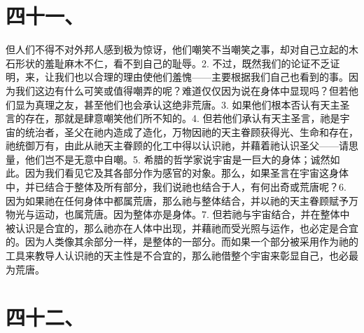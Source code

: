 
\section{四十一、}

但人们不得不对外邦人感到极为惊讶，他们嘲笑不当嘲笑之事，却对自己立起的木石形状的羞耻麻木不仁，看不到自己的耻辱。2. 不过，既然我们的论证不乏证明，来，让我们也以合理的理由使他们羞愧——主要根据我们自己也看到的事。因为我们这边有什么可笑或值得嘲弄的呢？难道仅仅因为说在身体中显现吗？但若他们显为真理之友，甚至他们也会承认这绝非荒唐。3. 如果他们根本否认有天主圣言的存在，那就是肆意嘲笑他们所不知的。4. 但若他们承认有天主圣言，祂是宇宙的统治者，圣父在祂内造成了造化，万物因祂的天主眷顾获得光、生命和存在，祂统御万有，由此从祂天主眷顾的化工中得以认识祂，并藉着祂认识圣父——请思量，他们岂不是无意中自嘲。5. 希腊的哲学家说宇宙是一巨大的身体；诚然如此。因为我们看见它及其各部分作为感官的对象。那么，如果圣言在宇宙这身体中，并已结合于整体及所有部分，我们说祂也结合于人，有何出奇或荒唐呢？6. 因为如果祂在任何身体中都属荒唐，那么祂与整体结合，并以祂的天主眷顾赋予万物光与运动，也属荒唐。因为整体亦是身体。7. 但若祂与宇宙结合，并在整体中被认识是合宜的，那么祂亦在人体中出现，并藉祂而受光照与运作，也必定是合宜的。因为人类像其余部分一样，是整体的一部分。而如果一个部分被采用作为祂的工具来教导人认识祂的天主性是不合宜的，那么祂借整个宇宙来彰显自己，也必最为荒唐。\par


\section{四十二、}

